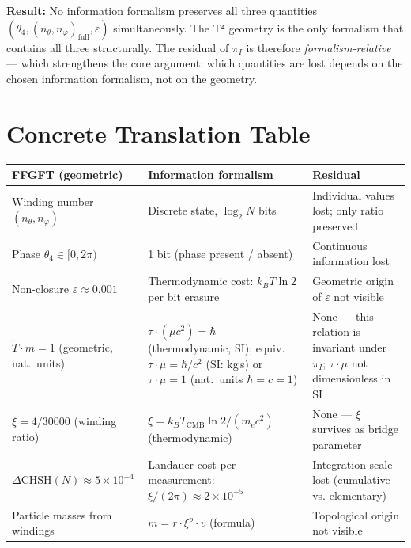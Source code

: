 \textbf{Result:} No information formalism preserves all three quantities
$(\theta_4, (n_\theta,n_\varphi)_\text{full}, \varepsilon)$ simultaneously.
The T⁴ geometry is the only formalism that contains all three structurally.
The residual of $\pi_I$ is therefore \emph{formalism-relative} --- which
strengthens the core argument: which quantities are lost depends on the
chosen information formalism, not on the geometry.

\section{Concrete Translation Table}

\begin{center}
\renewcommand{\arraystretch}{1.4}
{\small
\begin{tabular}{p{5.2cm}p{6.0cm}p{5.2cm}}
\toprule
\textbf{FFGFT (geometric)} & \textbf{Information formalism} & \textbf{Residual} \\
\midrule
Winding number $(n_\theta, n_\varphi)$
  & Discrete state, $\log_2 N$ bits
  & Individual values lost; only ratio preserved \\[4pt]
Phase $\theta_4 \in [0, 2\pi)$
  & 1 bit (phase present / absent)
  & Continuous information lost \\[4pt]
Non-closure $\varepsilon \approx 0.001$
  & Thermodynamic cost: $k_B T \ln 2$ per bit erasure
  & Geometric origin of $\varepsilon$ not visible \\[4pt]
$\tilde{T} \cdot m = 1$ (geometric, nat.\ units)
  & $\tau \cdot (\mu c^2) = \hbar$ (thermodynamic, SI);
    equiv.\ $\tau \cdot \mu = \hbar/c^2$ (SI: kg\,s)
    or $\tau \cdot \mu = 1$ (nat.\ units $\hbar=c=1$)
  & None --- this relation is invariant under $\pi_I$;
    $\tau\cdot\mu$ not dimensionless in SI \\[4pt]
$\xi = 4/30000$ (winding ratio)
  & $\xi = k_B T_\text{CMB} \ln 2 / (m_e c^2)$ (thermodynamic)
  & None --- $\xi$ survives as bridge parameter \\[4pt]
$\Delta\text{CHSH}(N) \approx 5 \times 10^{-4}$
  & Landauer cost per measurement: $\xi/(2\pi) \approx 2 \times 10^{-5}$
  & Integration scale lost (cumulative vs. elementary) \\[4pt]
Particle masses from windings
  & $m = r \cdot \xi^p \cdot v$ (formula)
  & Topological origin not visible \\[4pt]
\bottomrule
\end{tabular}
}
\end{center}

